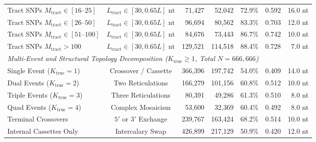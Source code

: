 \begin{table}[t!]
{\begin{tabular}{@{}l c r r r c r@{}}
Tract SNPs $M_{\mathrm{tract}} \in [16\text{--}25]$ & $L_{\mathrm{tract}} \in [30, 0.65 L]\text{ nt}$ & 71,427 & 52,042 & 72.9\% & 0.592 & 16.0 nt \\
Tract SNPs $M_{\mathrm{tract}} \in [26\text{--}50]$ & $L_{\mathrm{tract}} \in [30, 0.65 L]\text{ nt}$ & 96,694 & 80,562 & 83.3\% & 0.703 & 12.0 nt \\
Tract SNPs $M_{\mathrm{tract}} \in [51\text{--}100]$ & $L_{\mathrm{tract}} \in [30, 0.65 L]\text{ nt}$ & 84,676 & 73,443 & 86.7\% & 0.742 & 10.0 nt \\
Tract SNPs $M_{\mathrm{tract}} > 100$ & $L_{\mathrm{tract}} \in [30, 0.65 L]\text{ nt}$ & 129,521 & 114,518 & 88.4\% & 0.728 & 7.0 nt \\
\midrule
\multicolumn{7}{l}{\textit{Multi-Event and Structural Topology Decomposition ($K_{\mathrm{true}} \ge 1$, Total $N = 666{,}666$)}} \\
Single Event ($K_{\mathrm{true}} = 1$) & Crossover / Cassette & 366,396 & 197,742 & 54.0\% & 0.409 & 14.0 nt \\
Dual Events ($K_{\mathrm{true}} = 2$) & Two Reticulations & 166,279 & 101,156 & 60.8\% & 0.512 & 10.0 nt \\
Triple Events ($K_{\mathrm{true}} = 3$) & Three Reticulations & 80,391 & 49,286 & 61.3\% & 0.510 & 8.0 nt \\
Quad Events ($K_{\mathrm{true}} = 4$) & Complex Mosaicism & 53,600 & 32,369 & 60.4\% & 0.492 & 8.0 nt \\
Terminal Crossovers & $5'$ or $3'$ Exchange & 239,767 & 163,424 & 68.2\% & 0.514 & 10.0 nt \\
Internal Cassettes Only & Intercalary Swap & 426,899 & 217,129 & 50.9\% & 0.420 & 12.0 nt \\
\bottomrule
\end{tabular}}
\end{table}
